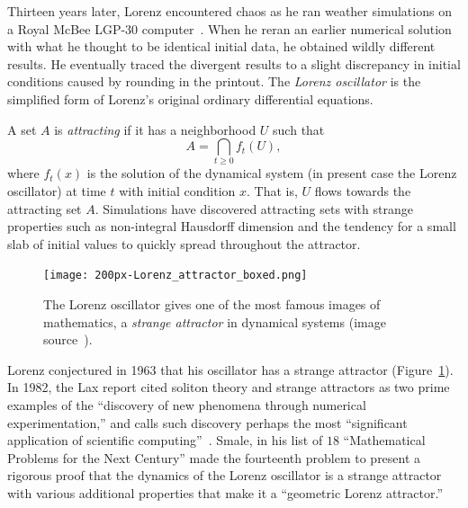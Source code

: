 \documentclass{llncs}
\begin{document}
Thirteen years later, Lorenz encountered chaos as he ran weather
simulations on a Royal McBee LGP-30 computer~\cite{Lo63}.  When he
reran an earlier numerical solution with what he thought to be
identical initial data, he obtained wildly different results.  He
eventually traced the divergent results to a slight discrepancy in
initial conditions caused by rounding in the printout.  The {\it Lorenz
  oscillator} is the simplified form of Lorenz's original ordinary
differential equations.

A set $A$ is {\it attracting} if it has a neighborhood $U$ such
that
\[
A = \bigcap_{t\ge 0} f_t(U),
\]
where $f_t(x)$ is the solution of the dynamical system (in present
case the Lorenz oscillator) at time $t$ with initial condition
$x$. That is, $U$ flows towards the attracting set $A$.  Simulations
have discovered attracting sets with strange properties such as
non-integral Hausdorff dimension and the tendency for a small slab of
initial values to quickly spread throughout the attractor.



% 

\begin{figure}[h!]
  \centering
\texttt{[image: 200px-Lorenz\_attractor\_boxed.png]}
  \caption{The Lorenz oscillator gives one of the
most famous images of mathematics, a {\it strange attractor} in
dynamical systems (image source~\cite{Lor11}).}
\label{fig:lorenz}
\end{figure}


Lorenz conjectured in 1963 that his oscillator has a strange attractor
(Figure~\ref{fig:lorenz}).  In 1982, the Lax report cited soliton
theory and strange attractors as two prime examples of the ``discovery
of new phenomena through numerical experimentation,'' and calls such
discovery perhaps the most ``significant application of scientific
computing''~\cite{Lax}.  Smale, in his list of $18$ ``Mathematical
Problems for the Next Century'' made the fourteenth problem to present
a rigorous proof that the dynamics of the Lorenz oscillator is a
strange attractor~\cite{Sma98} with various additional properties that
make it a ``geometric Lorenz attractor.''
\end{document}
